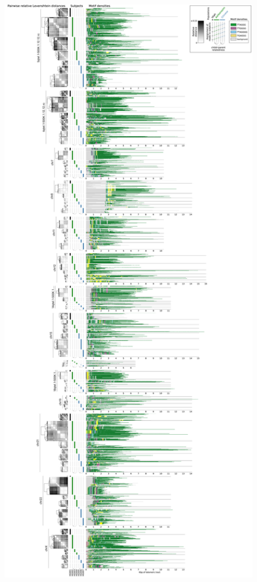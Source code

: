 \documentclass{article}
\begin{document}
                \begin{figure}[h!] \centering %
                \includegraphics[height=.88\textheight,width=\textwidth,keepaspectratio]{renders/figures/Figure-SH.png} %

\end{figure}
\end{document}
